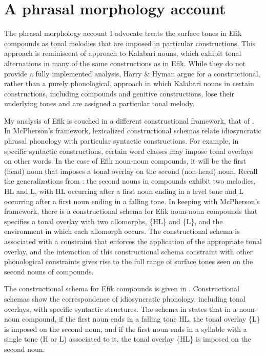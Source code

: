 \documentclass[output=paper]{langscibook}
\begin{document}
\section{A phrasal morphology account}\label{sec:glewwe:2}

The phrasal morphology account I advocate treats the surface tones in Efik compounds as tonal melodies that are imposed in particular constructions. This approach is reminiscent of \cite{harry2014phrasal} approach to Kalabari nouns, which exhibit tonal alternations in many of the same constructions as in Efik. While they do not provide a fully implemented analysis, Harry \& Hyman argue for a constructional, rather than a purely phonological, approach in which Kalabari nouns in certain constructions, including compounds and genitive constructions, lose their underlying tones and are assigned a particular tonal melody. 

My analysis of Efik is couched in a different constructional framework, that of \citealt{McPherson2014}. In McPherson’s framework, lexicalized constructional schemas relate idiosyncratic phrasal phonology with particular syntactic constructions. For example, in specific syntactic constructions, certain word classes may impose tonal overlays on other words. In the case of Efik noun-noun compounds, it will be the first (head) noun that imposes a tonal overlay on the second (non-head) noun. Recall the generalizations from : the second nouns in compounds exhibit two melodies, HL and L, with HL occurring after a first noun ending in a level tone and L occurring after a first noun ending in a falling tone. In keeping with McPherson’s framework, there is a constructional schema for Efik noun-noun compounds that specifies a tonal overlay with two allomorphs, \{HL\} and \{L\}, and the environment in which each allomorph occurs. The constructional schema is associated with a constraint that enforces the application of the appropriate tonal overlay, and the interaction of this constructional schema constraint with other phonological constraints gives rise to the full range of surface tones seen on the second nouns of compounds. 

The constructional schema for Efik compounds is given in . Constructional schemas show the correspondence of idiosyncratic phonology, including tonal overlays, with specific syntactic structures. The schema in  states that in a noun-noun compound, if the first noun ends in a falling tone HL, the tonal overlay \{L\} is imposed on the second noun, and if the first noun ends in a syllable with a single tone (H or L) associated to it, the tonal overlay \{HL\} is imposed on the second noun. 
\end{document}
